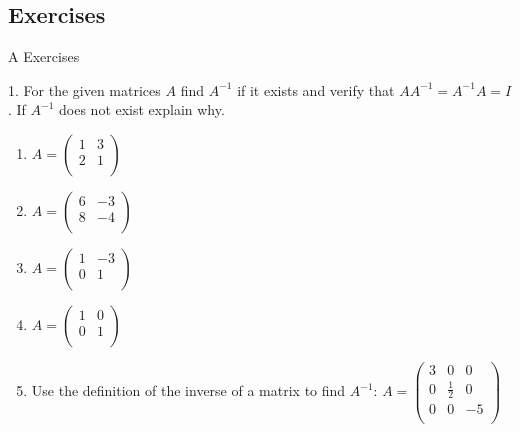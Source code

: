 \documentclass[10pt,]{book}
\theoremstyle{plain}
\theoremstyle{definition}
\theoremstyle{definition}
\theoremstyle{definition}
\theoremstyle{definition}
\begin{document}
\subsection[Exercises]{Exercises}\label{exercises-5-4}
\hypertarget{exercisegroup-3}{}\typeout{************************************************}
\typeout{************************************************}
A Exercises%
\begin{exercisegroup}
\item[1.]\hypertarget{exercise-8}{} For the given matrices \(A\) find \(A^{-1}\) if it exists and verify that \(A A^{-1}=A^{-1}A = I\).  If \(A^{-1}\) does not exist
explain why.%
\par
\leavevmode%
\begin{enumerate}[label=\alph*]
\item\hypertarget{li-48}{}  \(A = \left(
\begin{array}{cc}
 1 & 3 \\
 2 & 1 \\
\end{array}
\right)\) 
%
\item\hypertarget{li-49}{} \(A=\left(
\begin{array}{cc}
 6 & -3 \\
 8 & -4 \\
\end{array}
\right)\)
%
\item\hypertarget{li-50}{} \(A = \left(
\begin{array}{cc}
 1 & -3 \\
 0 & 1 \\
\end{array}
\right)\)
%
\item\hypertarget{li-51}{}  \(A = \left(
\begin{array}{cc}
 1 & 0 \\
 0 & 1 \\
\end{array}
\right)\)
%
\item\hypertarget{li-52}{} Use the definition of the inverse of a matrix to find \(A^{-1}\):
 \(A=\left(
\begin{array}{ccc}
 3 & 0 & 0 \\
 0 & \frac{1}{2} & 0 \\
 0 & 0 & -5 \\
\end{array}
\right)\)
%
\end{enumerate}
%
\par\smallskip
\par\smallskip

\end{exercisegroup}
\end{document}
